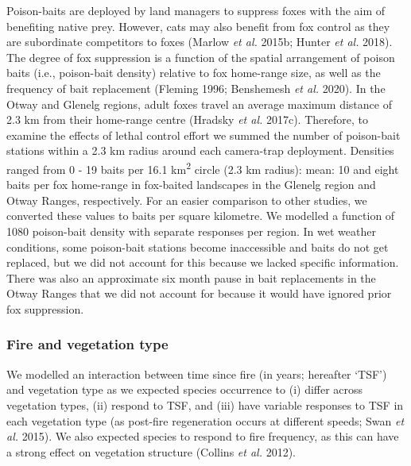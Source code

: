 \documentclass[11pt,a4paper,titlepage,twoside,openright]{style/unimelbthesis}
\begin{document}
\begin{mainmatter}
Poison-baits are deployed by land managers to suppress foxes with the aim of benefiting native prey. However, cats may also benefit from fox control as they are subordinate competitors to foxes (Marlow \emph{et al.} 2015b; Hunter \emph{et al.} 2018). The degree of fox suppression is a function of the spatial arrangement of poison baits (i.e., poison-bait density) relative to fox home-range size, as well as the frequency of bait replacement (Fleming 1996; Benshemesh \emph{et al.} 2020). In the Otway and Glenelg regions, adult foxes travel an average maximum distance of 2.3 km from their home-range centre (Hradsky \emph{et al.} 2017c). Therefore, to examine the effects of lethal control effort we summed the number of poison-bait stations within a 2.3 km radius around each camera-trap deployment. Densities ranged from 0 - 19 baits per 16.1 km\textsuperscript{2} circle (2.3 km radius): mean: 10 and eight baits per fox home-range in fox-baited landscapes in the Glenelg region and Otway Ranges, respectively. For an easier comparison to other studies, we converted these values to baits per square kilometre. We modelled a function of 1080 poison-bait density with separate responses per region. In wet weather conditions, some poison-bait stations become inaccessible and baits do not get replaced, but we did not account for this because we lacked specific information. There was also an approximate six month pause in bait replacements in the Otway Ranges that we did not account for because it would have ignored prior fox suppression.

\hypertarget{fire-and-vegetation-type}{%
\subsubsection{Fire and vegetation type}\label{fire-and-vegetation-type}}

We modelled an interaction between time since fire (in years; hereafter `TSF') and vegetation type as we expected species occurrence to (i) differ across vegetation types, (ii) respond to TSF, and (iii) have variable responses to TSF in each vegetation type (as post-fire regeneration occurs at different speeds; Swan \emph{et al.} 2015). We also expected species to respond to fire frequency, as this can have a strong effect on vegetation structure (Collins \emph{et al.} 2012).


\end{mainmatter}
\end{document}
